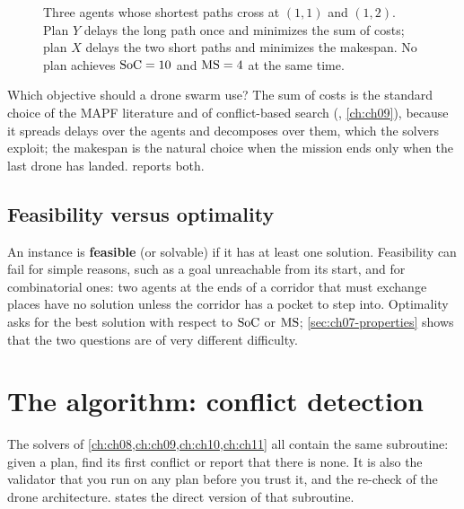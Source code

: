 \begin{figure}[!htb]
  \centering
  \caption{Three agents whose shortest paths cross at $(1,1)$ and $(1,2)$.
  Plan $Y$ delays the long path once and minimizes the sum of costs; plan $X$
  delays the two short paths and minimizes the makespan. No plan achieves
  $\mathrm{SoC} = 10$ and $\mathrm{MS} = 4$ at the same time.}
  \label{fig:ch07-objectives-disagree}
\end{figure}

Which objective should a drone swarm use? The sum of costs is the standard
choice of the MAPF literature and of conflict-based search (\cbs,
\cref{ch:ch09}), because it spreads delays over the agents and decomposes
over them, which the solvers exploit; the makespan is the natural choice when
the mission ends only when the last drone has landed.  reports
both.

\subsection{Feasibility versus optimality}

An instance is \textbf{feasible} (or solvable) if it
has at least one solution. Feasibility can fail for simple reasons, such as a
goal unreachable from its start, and for combinatorial ones: two agents at
the ends of a corridor that must exchange places have no solution unless the
corridor has a pocket to step into. Optimality asks for the best solution
with respect to $\mathrm{SoC}$ or $\mathrm{MS}$; \cref{sec:ch07-properties} shows
that the two questions are of very different difficulty.

\section{The algorithm: conflict detection}
\label{sec:ch07-detection}

The solvers of \cref{ch:ch08,ch:ch09,ch:ch10,ch:ch11} all contain the same
subroutine: given a plan, find its first conflict or report that there is
none. It is also the validator that you run on any
plan before you trust it, and the re-check of the drone architecture.
 states the direct version of that subroutine.

